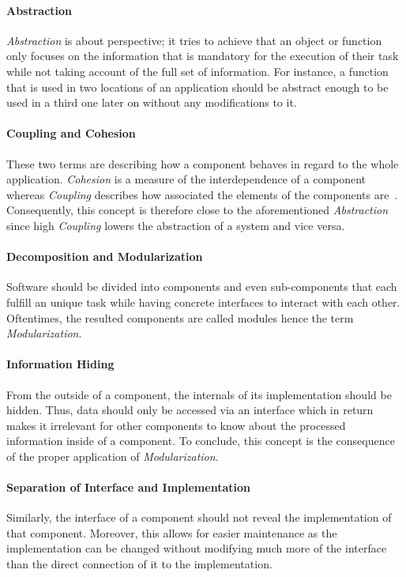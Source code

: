 \documentclass[12pt,a4paper,twoside]{report}
\begin{document}
\paragraph{Abstraction}
\textit{Abstraction} is about perspective; it tries to achieve that an object or
function only focuses on the information that is mandatory for the execution of
their task while not taking account of the full set of information.
For instance, a function that is used in two locations of an application
should be abstract enough to be used in a third one later on without
any modifications to it.

\paragraph{Coupling and Cohesion}
These two terms are describing how a component behaves in regard to the whole application.
\textit{Cohesion} is a measure of the interdependence of a component whereas
\textit{Coupling} describes how associated the elements of the components are~\cite{swebok}.
Consequently, this concept is therefore close to the aforementioned \textit{Abstraction}
since high \textit{Coupling} lowers the abstraction of a system and vice versa.

\paragraph{Decomposition and Modularization}
Software should be divided into components and even sub-components that each fulfill
an unique task while having concrete interfaces to interact with each other.
Oftentimes, the resulted components are called modules hence the term \textit{Modularization}.

\paragraph{Information Hiding}
From the outside of a component, the internals of its implementation should be hidden.
Thus, data should only be accessed via an interface which in return makes it irrelevant
for other components to know about the processed information inside of a component.
To conclude, this concept is the consequence of the proper application of \textit{Modularization}.

\paragraph{Separation of Interface and Implementation}
Similarly, the interface of a component should not reveal the implementation of
that component. Moreover, this allows for easier maintenance as the implementation
can be changed without modifying much more of the interface than the direct connection
of it to the implementation.
\end{document}
